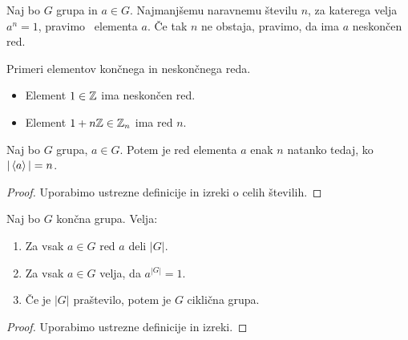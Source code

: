 \begin{definicija}
    Naj bo $G$ grupa in $a \in G$. Najmanjšemu naravnemu številu $n$, za katerega velja $a^n=1$, pravimo ~elementa $a$. Če tak $n$ ne obstaja, pravimo, da ima $a$ neskončen red.
\end{definicija}

\begin{primer}
    Primeri elementov končnega in neskončnega reda.
    \begin{itemize}
        \item Element $1 \in \mathbb{Z}$ ima neskončen red.
        \item Element $1 + n\mathbb{Z} \in \mathbb{Z}_n$ ima red $n$.
    \end{itemize}    
\end{primer}

\begin{trditev}
    Naj bo $G$ grupa, $a \in G$. Potem je red elementa $a$ enak $n$ natanko tedaj, ko $|\left\langle {a} \right\rangle| = n$.
\end{trditev}

\begin{proof}
    Uporabimo ustrezne definicije in izreki o celih številih.
\end{proof}

\begin{posledica}
    Naj bo $G$ končna grupa. Velja:
    \begin{enumerate}
        \item Za vsak $a \in G$ red $a$ deli $|G|$.
        \item Za vsak $a \in G$ velja, da $a^{|G|} = 1$.
        \item Če je $|G|$ praštevilo, potem je $G$ ciklična grupa. 
    \end{enumerate}
\end{posledica}

\begin{proof}
    Uporabimo ustrezne definicije in izreki.
\end{proof}